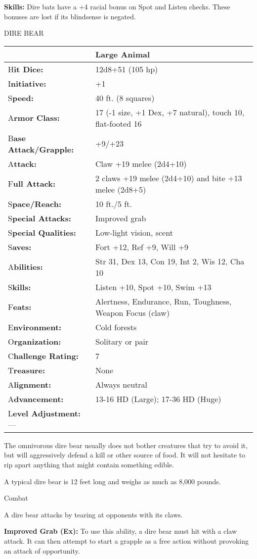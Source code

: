\documentclass{article}
\begin{document}
\textbf{Skills:} Dire bats have a +4 racial bonus on Spot and Listen checks. These 
bonuses are lost if its blindsense is negated.

\vspace{12pt}
DIRE BEAR

\begin{tabular}{|>{\raggedright}p{88pt}|>{\raggedright}p{237pt}|}
\hline
  & Large Animal\tabularnewline
\hline
H\textbf{it Dice:} & 12d8+51 (105 hp)\tabularnewline
\hline
I\textbf{nitiative:} & +1\tabularnewline
\hline
S\textbf{peed:} & 40 ft. (8 squares)\tabularnewline
\hline
A\textbf{rmor Class:} & 17 (-1 size, +1 Dex, +7 natural), touch 10, flat-footed 
16\tabularnewline
\hline
B\textbf{ase Attack/Grapple:} & +9/+23\tabularnewline
\hline
A\textbf{ttack:} & Claw +19 melee (2d4+10)\tabularnewline
\hline
F\textbf{ull Attack:} & 2 claws +19 melee (2d4+10) and bite +13 melee (2d8+5)\tabularnewline
\hline
S\textbf{pace/Reach:} & 10 ft./5 ft.\tabularnewline
\hline
S\textbf{pecial Attacks:} & Improved grab\tabularnewline
\hline
S\textbf{pecial Qualities:} & Low-light vision, scent\tabularnewline
\hline
S\textbf{aves:} & Fort +12, Ref +9, Will +9\tabularnewline
\hline
A\textbf{bilities:} & Str 31, Dex 13, Con 19, Int 2, Wis 12, Cha 10\tabularnewline
\hline
S\textbf{kills:} & Listen +10, Spot +10, Swim +13\tabularnewline
\hline
F\textbf{eats:} & Alertness, Endurance, Run, Toughness, Weapon Focus (claw)\tabularnewline
\hline
E\textbf{nvironment:} & Cold forests\tabularnewline
\hline
O\textbf{rganization:} & Solitary or pair\tabularnewline
\hline
C\textbf{hallenge Rating:} & 7\tabularnewline
\hline
T\textbf{reasure:} & None\tabularnewline
\hline
A\textbf{lignment:} & Always neutral\tabularnewline
\hline
A\textbf{dvancement:} & 13-16 HD (Large); 17-36 HD (Huge)\tabularnewline
\hline
L\textbf{evel Adjustment:}--- & \tabularnewline
\hline
\end{tabular}

The omnivorous dire bear usually does not bother creatures that try to avoid it, 
but will aggressively defend a kill or other source of food. It will not hesitate 
to rip apart anything that might contain something edible.

A typical dire bear is 12 feet long and weighs as much as 8,000 pounds.

Combat

A dire bear attacks by tearing at opponents with its claws.

\textbf{Improved Grab (Ex):} To use this ability, a dire bear must hit with a claw 
attack. It can then attempt to start a grapple as a free action without provoking 
an attack of opportunity.
\end{document}
